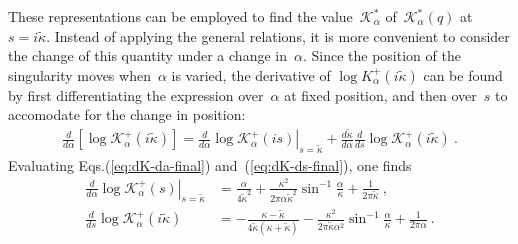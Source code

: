 \documentclass[preprint,aps,eqsecnum, prb]{revtex4-1}
\newcommand{\fplus}[1]{{#1}^{+}}
\begin{document}
These representations can be employed to find the
value~$\mathcal{K}_\alpha^\ast$  of~$\mathcal{K}_\alpha^\ast(q)$
at~$s = i\tilde{\kappa}$. Instead of applying the general relations,
it is more convenient to consider the change of this quantity
under a change in~$\alpha$. Since the position
of the singularity moves when~$\alpha$ is varied, the derivative of
$\log \fplus{K}_\alpha(i \tilde{\kappa})$
can be found by first differentiating the expression over~$\alpha$
at fixed position,
and then over~$s$ to accomodate for the change in position:
\begin{align}
  \label{eq:appA-two-contribs}
  \frac{d}{d\alpha} [\log \fplus{\mathcal{K}}_\alpha(i{\tilde \kappa})] =
  \left.\frac{d}{d\alpha} \log \fplus{\mathcal{K}}_\alpha(is)
  \right|_{s = {\tilde{\kappa}}}
  + \frac{d{\tilde \kappa}}{d\alpha}
  \frac{d}{ds} \log \fplus{\mathcal{K}}_\alpha (i{\tilde \kappa}) \ .
\end{align}
Evaluating Eqs.(\ref{eq:dK-da-final}) and~(\ref{eq:dK-ds-final}), one finds
%
\begin{align}
  \label{eq:appA-1st-half}
  \left.\frac{d}{d\alpha}\log \fplus{\mathcal{K}}_{\alpha}(s)
  \right|_{s = {\tilde\kappa}}
  &= \frac{\alpha}{4{\tilde\kappa}^2}
  + \frac{\kappa^2}{2\pi\alpha{\tilde\kappa}^2} \sin^{-1}\frac{\alpha}{\kappa}
  + \frac{1}{2\pi{\tilde\kappa}}\ , \\
  \label{eq:appA-2nd-half}
  \frac{d}{ds} \log \fplus{\mathcal{K}}_{\alpha}(i{\tilde{\kappa}})
  &= - \frac{\kappa - {\tilde{\kappa}}}{4{\tilde \kappa} (\kappa + {\tilde\kappa})}
  - \frac{\kappa^2}{2\pi{\tilde\kappa} \alpha^2}
  \sin^{-1}\frac{\alpha}{\kappa} + \frac{1}{2\pi\alpha}\ .
\end{align}
\end{document}
